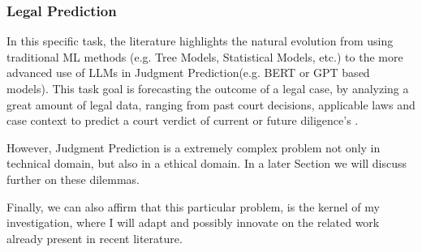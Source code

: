 \documentclass[11pt,a4paper,twoside,openright]{book}
\begin{document}
\subsubsection{Legal Prediction}
In this specific task, the literature highlights the natural evolution from using traditional ML methods (e.g. Tree Models, Statistical Models, etc.) to the more advanced use of LLMs in Judgment Prediction(e.g. BERT or GPT based models). This task goal is forecasting the outcome of a legal case, by analyzing a great amount of legal data, ranging from past court decisions, applicable laws and case context to predict a court verdict of current or future diligence's \parencite{siino_Lit_review_LLMs_2025, zhong_summary_LegalAI_2020}.
\par However, Judgment Prediction is a extremely complex problem not only in technical domain, but also in a ethical domain. In a later Section we will discuss further on these dilemmas. 
\par Finally, we can also affirm that this particular problem, is the kernel of my investigation, where I will adapt and possibly innovate on the related work already present in recent literature.
\end{document}

